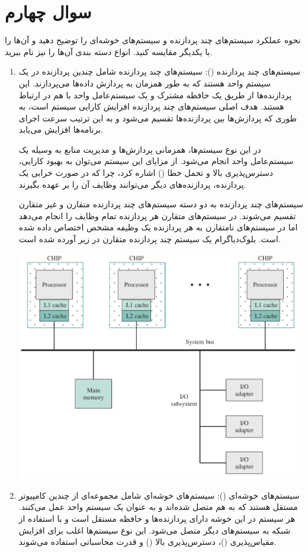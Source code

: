 \section{سوال چهارم}


نحوه عملکرد سیستم‌های چند پردازنده و سیستم‌های خوشه‌ای را توضیح دهید و آن‌ها را با یکدیگر مقایسه کنید. انواع دسته بندی آن‌ها را نیز نام ببرید.


\begin{qsolve}
	
	\begin{enumerate}
		\item 
		سیستم‌های چند پردازنده (): سیستم‌های چند پردازنده شامل چندین پردازنده در یک سیستم واحد هستند که به طور همزمان به پردازش داده‌ها می‌پردازند. این پردازنده‌ها از طریق یک حافظه مشترک و یک سیستم‌عامل واحد با هم در ارتباط هستند. هدف اصلی سیستم‌های چند پردازنده افزایش کارایی سیستم است، به طوری که پردازش‌ها بین پردازنده‌ها تقسیم می‌شود و به این ترتیب سرعت اجرای برنامه‌ها افزایش می‌یابد.
		
		در این نوع سیستم‌ها، همزمانی پردازش‌ها و مدیریت منابع به وسیله یک سیستم‌عامل واحد انجام می‌شود. از مزایای این سیستم می‌توان به بهبود کارایی، دسترس‌پذیری بالا و تحمل خطا () اشاره کرد، چرا که در صورت خرابی یک پردازنده، پردازنده‌های دیگر می‌توانند وظایف آن را بر عهده بگیرند. 
		
		سیستم‌های چند پردازنده به دو دسته سیستم‌های چند پردازنده متقارن و غیر متقارن تقسیم می‌شوند. در سیستم‌های متقارن هر پردازنده تمام وظایف را انجام می‌دهد اما در سیستم‌های نامتقارن به هر پردازنده یک وظیفه مشخص اختصاص داده شده است. بلوک‌دیاگرام یک سیستم چند پردازنده متقارن در زیر آورده شده است.
		
		\begin{center}
			\includegraphics*[width=0.7\linewidth]{pics/img4.png}
		\end{center}
		
		
		
		\item
		سیستم‌های خوشه‌ای (): سیستم‌های خوشه‌ای شامل مجموعه‌ای از چندین کامپیوتر مستقل هستند که به هم متصل شده‌اند و به عنوان یک سیستم واحد عمل می‌کنند. هر سیستم در این خوشه دارای پردازنده‌ها و حافظه مستقل است و با استفاده از شبکه به سیستم‌های دیگر متصل می‌شود. این نوع سیستم‌ها اغلب برای افزایش مقیاس‌پذیری ()، دسترس‌پذیری بالا () و قدرت محاسباتی استفاده می‌شوند.		
	\end{enumerate}
\end{qsolve}

